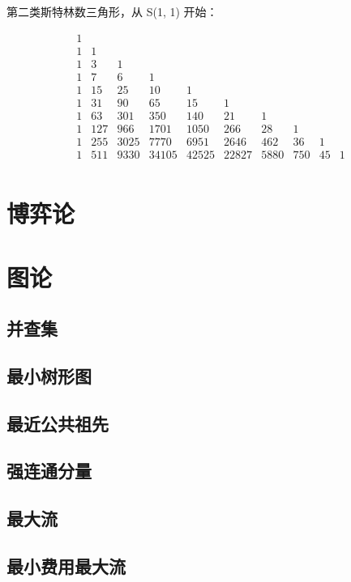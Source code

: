 \documentclass{article}
\begin{document}
第二类斯特林数三角形，从 S(1, 1) 开始：

$$
\begin{matrix}
1 \\
1 & 1 \\
1 & 3 & 1 \\
1 & 7 & 6 & 1 \\
1 & 15 & 25 & 10 & 1 \\
1 & 31 & 90 & 65 & 15 & 1 \\
1 & 63 & 301 & 350 & 140 & 21 & 1 \\
1 & 127 & 966 & 1701 & 1050 & 266 & 28 & 1 \\
1 & 255 & 3025 & 7770 & 6951 & 2646 & 462 & 36 & 1 \\
1 & 511 & 9330 & 34105 & 42525 & 22827 & 5880 & 750 & 45 & 1 \\
\end{matrix}
$$

\section{博弈论}


\section{图论}
\subsection{并查集}

\subsection{最小树形图}

\subsection{最近公共祖先}

\subsection{强连通分量}

\subsection{最大流}

\subsection{最小费用最大流}

\end{document}

